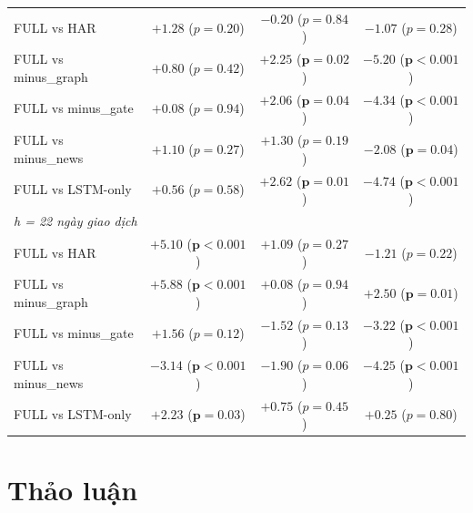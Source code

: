 \documentclass[runningheads]{llncs}
\begin{document}
\begin{table}[t]
\begin{tabular}{lccc}
FULL vs HAR         & $+1.28$ ($p = 0.20$) & $-0.20$ ($p = 0.84$) & $-1.07$ ($p = 0.28$) \\
FULL vs minus\_graph & $+0.80$ ($p = 0.42$) & $\mathbf{+2.25}$ ($\mathbf{p = 0.02}$) & $\mathbf{-5.20}$ ($\mathbf{p<0.001}$) \\
FULL vs minus\_gate  & $+0.08$ ($p = 0.94$) & $\mathbf{+2.06}$ ($\mathbf{p = 0.04}$) & $\mathbf{-4.34}$ ($\mathbf{p<0.001}$) \\
FULL vs minus\_news  & $+1.10$ ($p = 0.27$) & $+1.30$ ($p = 0.19$) & $\mathbf{-2.08}$ ($\mathbf{p = 0.04}$) \\
FULL vs LSTM-only   & $+0.56$ ($p = 0.58$) & $\mathbf{+2.62}$ ($\mathbf{p = 0.01}$) & $\mathbf{-4.74}$ ($\mathbf{p<0.001}$) \\
\midrule
\multicolumn{4}{l}{\textit{h = 22 ngày giao dịch}}\\
FULL vs HAR         & $\mathbf{+5.10}$ ($\mathbf{p<0.001}$) & $+1.09$ ($p = 0.27$) & $-1.21$ ($p = 0.22$) \\
FULL vs minus\_graph & $\mathbf{+5.88}$ ($\mathbf{p<0.001}$) & $+0.08$ ($p = 0.94$) & $\mathbf{+2.50}$ ($\mathbf{p = 0.01}$) \\
FULL vs minus\_gate  & $+1.56$ ($p = 0.12$) & $-1.52$ ($p = 0.13$) & $\mathbf{-3.22}$ ($\mathbf{p<0.001}$) \\
FULL vs minus\_news  & $\mathbf{-3.14}$ ($\mathbf{p<0.001}$) & $-1.90$ ($p = 0.06$) & $\mathbf{-4.25}$ ($\mathbf{p<0.001}$) \\
FULL vs LSTM-only   & $\mathbf{+2.23}$ ($\mathbf{p = 0.03}$) & $+0.75$ ($p = 0.45$) & $+0.25$ ($p = 0.80$) \\
\bottomrule
\end{tabular}
\end{table}

\section{Thảo luận}
\label{sec:discussion}
\end{document}
